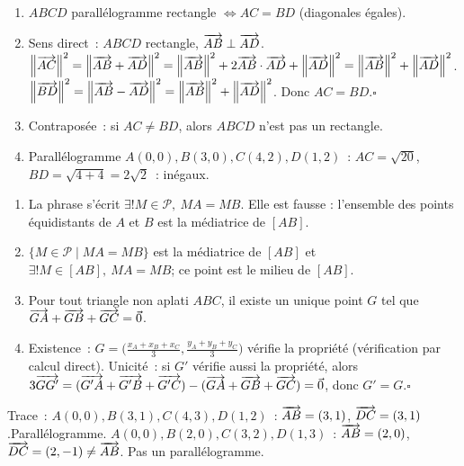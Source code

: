 
\begin{enumerate}
  \item $ABCD$ parall\'elogramme rectangle
        $\Leftrightarrow AC=BD$ (diagonales \'egales).
  \item Sens direct~: $ABCD$ rectangle, $\overrightarrow{AB}\perp\overrightarrow{AD}$.
        $\left\|\overrightarrow{AC}\right\|^2=\left\|\overrightarrow{AB}+\overrightarrow{AD}\right\|^2=\left\|\overrightarrow{AB}\right\|^2+2\overrightarrow{AB}\cdot\overrightarrow{AD}+\left\|\overrightarrow{AD}\right\|^2=\left\|\overrightarrow{AB}\right\|^2+\left\|\overrightarrow{AD}\right\|^2$.
        $\left\|\overrightarrow{BD}\right\|^2=\left\|\overrightarrow{AB}-\overrightarrow{AD}\right\|^2=\left\|\overrightarrow{AB}\right\|^2+\left\|\overrightarrow{AD}\right\|^2$.
        Donc $AC=BD$.\hfill$\square$
  \item Contrapos\'ee~: si $AC\ne BD$, alors $ABCD$ n'est pas un rectangle.
  \item Parall\'elogramme $A(0,0),B(3,0),C(4,2),D(1,2)$~:
        $AC=\sqrt{20}$, $BD=\sqrt{4+4}=2\sqrt{2}$~: in\'egaux.\checkmark
\end{enumerate}


\begin{enumerate}
  \item La phrase s'écrit
        $\exists !M\in\mathcal P,\ MA=MB$. Elle est fausse : l'ensemble des
        points équidistants de $A$ et $B$ est la médiatrice de $[AB]$.
  \item $\{M\in\mathcal P\mid MA=MB\}$ est la médiatrice de $[AB]$ et
        $\exists !M\in[AB],\ MA=MB$; ce point est le milieu de $[AB]$.
  \item Pour tout triangle non aplati $ABC$, il existe un unique point $G$
        tel que $\overrightarrow{GA}+\overrightarrow{GB}+\overrightarrow{GC}=\vec{0}$.
  \item Existence~: $G=\bigl(\frac{x_A+x_B+x_C}{3},\frac{y_A+y_B+y_C}{3}\bigr)$ v\'erifie la propri\'et\'e
        (v\'erification par calcul direct). Unicit\'e~: si $G'$ v\'erifie aussi la propri\'et\'e,
        alors $3\overrightarrow{GG'}=(\overrightarrow{G'A}+\overrightarrow{G'B}+\overrightarrow{G'C})-(\overrightarrow{GA}+\overrightarrow{GB}+\overrightarrow{GC})=\vec{0}$,
        donc $G'=G$.\hfill$\square$
\end{enumerate}


Trace~:
$A(0,0),B(3,1),C(4,3),D(1,2)$~: $\overrightarrow{AB}=(3,1)$, $\overrightarrow{DC}=(3,1)$.\checkmark\quad Parall\'elogramme.
$A(0,0),B(2,0),C(3,2),D(1,3)$~: $\overrightarrow{AB}=(2,0)$, $\overrightarrow{DC}=(2,-1)\ne\overrightarrow{AB}$. Pas un parall\'elogramme.

